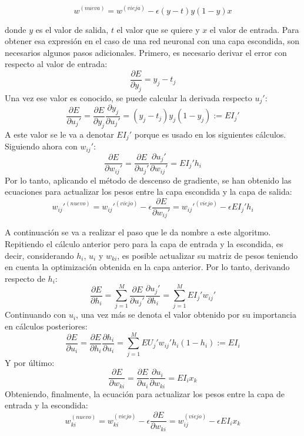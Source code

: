 \begin{equation}
    \label{eqn:gradient_descent_nn}
    w^{(nueva)}=w^{(vieja)}-\epsilon (y-t)y(1-y)x
\end{equation}

donde $y$ es el valor de salida, $t$ el valor que se quiere y $x$ el valor de entrada. Para obtener esa
expresión en el caso de una red neuronal con una capa escondida, son necesarios algunos pasos adicionales.
Primero, es necesario derivar el error con respecto al valor de entrada:
\[
    \frac{\partial E}{\partial y_j} = y_j - t_j
\]
Una vez ese valor es conocido, se puede calcular la derivada respecto $u_j'$:
\[
    \frac{\partial E}{\partial u_j'} =     \frac{\partial E}{\partial y_j}     \frac{\partial y_j}{\partial u_j'}=
    (y_j-t_j)y_j(1-y_j) := EI_j'
\]
A este valor se le va a denotar $EI_j'$ porque es usado en los siguientes cálculos. Siguiendo ahora con $w_{ij}'$:
\[
    \frac{\partial E}{\partial w_{ij}'} =     \frac{\partial E}{\partial u_j'}     \frac{\partial u_j'}{\partial w_{ij}'} =
    EI_j' h_i
\]
Por lo tanto, aplicando el método de descenso de gradiente, se han obtenido las ecuaciones para actualizar los pesos
entre la capa escondida y la capa de salida:
\[
    w_{ij}'^{(nuevo)} = w_{ij}'^{(viejo)} - \epsilon \frac{\partial E}{\partial w_{ij}'} =
    w_{ij}'^{(viejo)}-\epsilon EI_j' h_i
\]

A continuación se va a realizar el paso que le da nombre a este algoritmo. Repitiendo el cálculo anterior
pero para la capa de entrada y la escondida, es decir, considerando $h_i$, $u_i$ y $w_{ki}$, es posible
actualizar su matriz de pesos teniendo en cuenta la optimización obtenida en la capa anterior. Por lo tanto,
derivando respecto de $h_i$:
\[
    \frac{\partial E}{\partial h_i} = \sum_{j=1}^M\frac{\partial E}{\partial u_j'} \frac{\partial u_j'}{\partial h_i} =
    \sum_{j=1}^M EI_j' w_{ij}'
\]
Continuando con $u_i$, una vez más se denota el valor obtenido por su importancia en cálculos posteriores:
\[
    \frac{\partial E}{\partial u_i} =     \frac{\partial E}{\partial h_i}     \frac{\partial h_i}{\partial u_i} =
    \sum_{j=1}^M  EU_j' w_{ij}' h_i (1-h_i) := EI_i
\]
Y por último:
\[
    \frac{\partial E}{\partial w_{ki}} = \frac{\partial E}{\partial u_i} \frac{\partial u_i}{\partial w_{ki}} =
    EI_i x_k
\]
Obteniendo, finalmente, la ecuación para actualizar los pesos entre la capa de entrada y la escondida:
\[
    w_{ki}^{(nuevo)} = w_{ki}^{(viejo)} - \epsilon \frac{\partial E}{\partial w_{ki}} =
    w_{ij}^{(viejo)}-\epsilon EI_i x_k
\]